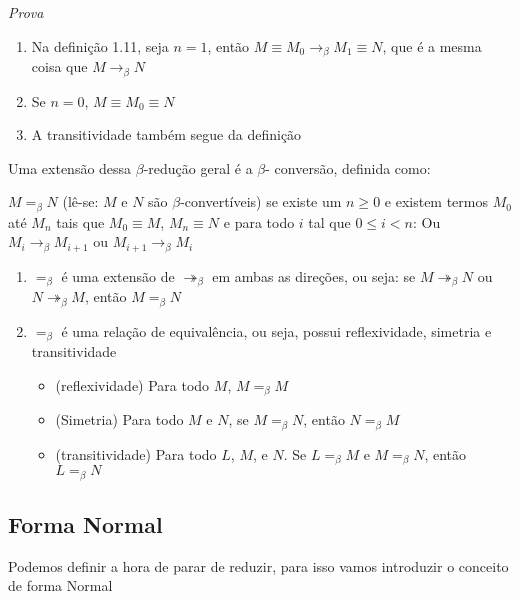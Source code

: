 \documentclass[../main.tex]{subfiles}
\begin{document}
\emph{Prova}
\begin{enumerate}
    \item Na definição 1.11, seja $n = 1$, então $M \equiv M_0 \to_{\beta} M_1 \equiv N$, que é a mesma coisa que $M \to_{\beta} N$
    \item Se $n = 0$, $M \equiv M_0 \equiv N$
    \item A transitividade também segue da definição
\end{enumerate}

Uma extensão dessa $\beta$-redução geral é a $\beta$- conversão, definida como:

\begin{definition}
    $M =_{\beta} N$ (lê-se: $M$  e $N$ são $\beta$-convertíveis) se existe um $n \geq 0$ e existem termos $M_0$ até $M_n$ tais que $M_0 \equiv M$, $M_n \equiv N$ e para todo $i$ tal que $0 \leq i < n$: Ou $M_i \to_{\beta} M_{i+1}$ ou $M_{i+1} \to_{\beta} M_i$
\end{definition}

\begin{lemma}
    \hfill
    \begin{enumerate}
        \item $=_{\beta}$ é uma extensão de $\twoheadrightarrow_{\beta}$ em ambas as direções, ou seja: se $M \twoheadrightarrow_{\beta} N$ ou $N \twoheadrightarrow_{\beta} M$, então $M =_{\beta} N$
        \item $=_{\beta}$ é uma relação de equivalência, ou seja, possui reflexividade, simetria e transitividade
        \begin{itemize}
            \item (reflexividade) Para todo $M$, $M =_{\beta} M$
            \item (Simetria) Para todo $M$ e $N$, se $M =_{\beta} N$, então $N =_{\beta} M$
            \item (transitividade) Para todo $L$, $M$, e $N$. Se $L =_{\beta} M$ e $M =_{\beta} N$, então $L =_{\beta} N$
        \end{itemize}
    \end{enumerate}
\end{lemma}

\subsection{Forma Normal}

Podemos definir a hora de parar de reduzir, para isso vamos introduzir o conceito de forma Normal
\end{document}
